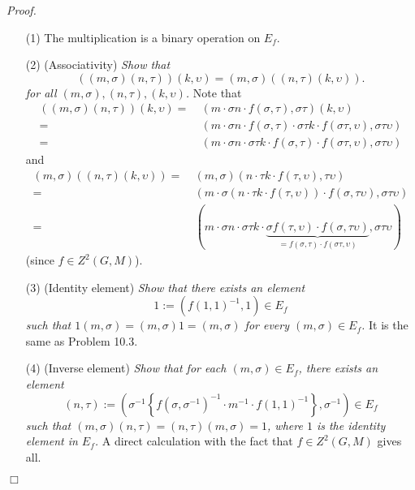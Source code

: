 \documentclass{article}
\begin{document}
\emph{Proof.}
\begin{enumerate}
\item[(1)]
  The multiplication is a binary operation on $E_f$.

\item[(2)]
  (Associativity)
  \emph{Show that
  \[
    ((m,\sigma)(n,\tau))(k,\upsilon) = (m,\sigma)((n,\tau)(k,\upsilon)).
  \]
  for all $(m,\sigma), (n,\tau), (k,\upsilon)$.}
  Note that
  \begin{align*}
    ((m,\sigma)(n,\tau))(k,\upsilon)
    = & \:
    (m \cdot \sigma n \cdot f(\sigma,\tau), \sigma\tau)(k,\upsilon) \\
    = & \:
    (m \cdot \sigma n \cdot f(\sigma,\tau)
        \cdot \sigma\tau k \cdot f(\sigma\tau, \upsilon), \sigma\tau\upsilon) \\
    = & \:
    (m \cdot \sigma n \cdot \sigma\tau k 
        \cdot f(\sigma,\tau) \cdot f(\sigma\tau, \upsilon), \sigma\tau\upsilon)
  \end{align*}
  and
  \begin{align*}
    (m,\sigma)((n,\tau)(k,\upsilon))
    = & \:
    (m,\sigma)(n \cdot \tau k \cdot f(\tau,\upsilon), \tau\upsilon) \\
    = & \:
    (m \cdot \sigma(n \cdot \tau k \cdot f(\tau,\upsilon))
        \cdot f(\sigma, \tau\upsilon), \sigma\tau\upsilon) \\
    = & \:
    (m \cdot \sigma n \cdot \sigma \tau k
        \cdot \underbrace{\sigma f(\tau,\upsilon) \cdot f(\sigma, \tau\upsilon)}_{=
            f(\sigma,\tau) \cdot f(\sigma\tau, \upsilon)},
        \sigma\tau\upsilon)
  \end{align*}
  (since $f \in Z^2(G,M)$).

\item[(3)]
  (Identity element)
  \emph{Show that there exists an element
  \[
    1 := (f(1,1)^{-1},1) \in E_f
  \]
  such that
  $1 (m,\sigma) = (m,\sigma) 1 = (m,\sigma)$ for every $(m,\sigma) \in E_f$.}
  It is the same as Problem 10.3.

\item[(4)]
  (Inverse element)
  \emph{Show that for each $(m,\sigma) \in E_f$,
  there exists an element
  \[
    (n,\tau)
    :=
    \left(\sigma^{-1}\left\{f(\sigma,\sigma^{-1})^{-1} \cdot m^{-1} \cdot f(1,1)^{-1}\right\}, \sigma^{-1} \right)
    \in E_f
  \]
  such that
  $(m,\sigma)(n,\tau) = (n,\tau)(m,\sigma) = 1$, where $1$ is the identity element in $E_f$.}
  A direct calculation with the fact that $f \in Z^2(G,M)$ gives all.
\end{enumerate}
$\Box$ \\\\



\end{document}
